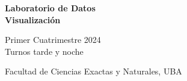 \documentclass[aspectratio=169,12pt]{beamer}
\begin{document}

\begin{frame}

 \begin{center}

\Large\textbf{Laboratorio de Datos} \\
\large\textbf{Visualización}




\vspace{1cm}
Primer Cuatrimestre 2024 \\ Turnos tarde y noche

\vspace{1cm}


 {\small Facultad de Ciencias Exactas y Naturales, UBA}
 \end{center}


\end{frame}

\end{document}
